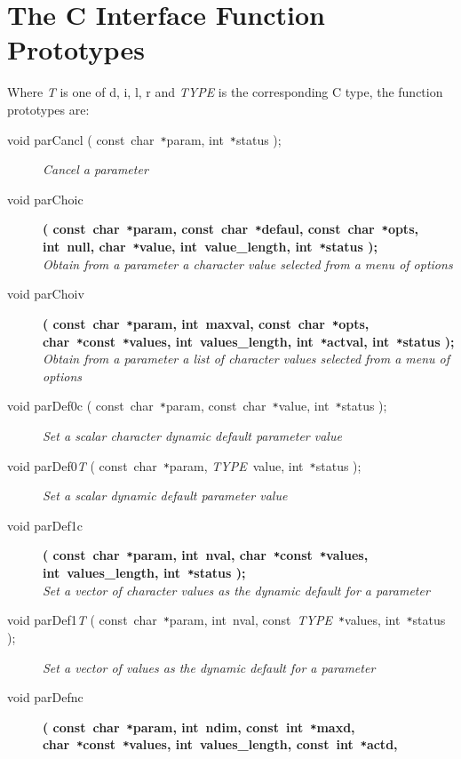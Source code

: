 \documentclass[twoside,11pt]{article}
\newcommand{\xlabel}[1]{}
\newcommand{\listline}{\hspace{1pt}\\}
\renewcommand{\listline}{}
\begin{document}
\section{\xlabel{c_interface_function_prototypes}The C Interface Function Prototypes}
Where \textit{T} is one of d, i, l, r and \textit{TYPE} is the corresponding C 
type, the function prototypes are:
\begin{flushleft}
\begin{description}
\item[void parCancl ( const~char~\texttt{*}param, int~\texttt{*}status );] \listline
\textit{Cancel a parameter}
\item[void parChoic]
\textbf{( const~char~\texttt{*}param, const~char~\texttt{*}defaul,
               const~char~\texttt{*}opts, int~null, char~\texttt{*}value,
               int~value\_length, int~\texttt{*}status );} \\
\textit{Obtain from a parameter a character value selected from a menu
            of options}
\item[void parChoiv]
\textbf{( const~char~\texttt{*}param, int~maxval, const~char~\texttt{*}opts, 
               char~\texttt{*}const~\texttt{*}values, int~values\_length,
               int~\texttt{*}actval, int~\texttt{*}status );} \\
\textit{Obtain from a parameter a list of character values selected from
            a menu of options}
\item[void parDef0c ( const~char~\texttt{*}param, const~char~\texttt{*}value,
int~\texttt{*}status );] \listline
\textit{Set a scalar character dynamic default parameter value}
\item[void parDef0\textit{T} ( const~char~\texttt{*}param, \textit{TYPE}~value,
int~\texttt{*}status );] \listline
\textit{Set a scalar dynamic default parameter value}
\item[void parDef1c]
\textbf{( const~char~\texttt{*}param, int~nval,
char~\texttt{*}const~\texttt{*}values, int~values\_length,
int~\texttt{*}status );} \\
\textit{Set a vector of character values as the dynamic default for a parameter}
\item[void parDef1\textit{T} ( const~char~\texttt{*}param, int~nval,
const~\textit{TYPE}~\texttt{*}values, int~\texttt{*}status );] \listline
\textit{Set a vector of values as the dynamic default for a parameter}
\item[void parDefnc]
\textbf{( const~char~\texttt{*}param, int~ndim, const~int~\texttt{*}maxd,
               char~\texttt{*}const~\texttt{*}values, int~values\_length, const~int~\texttt{*}actd, 
}
\end{description}
\end{flushleft}
\end{document}
